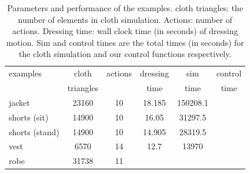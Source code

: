 \begin{table}
  \centering
  \begin{tabular}{|l|c|c|c|c|c|}
    \hline
    examples 		& cloth 	& actions 	& dressing 	& sim 		& control \\
    				& triangles & 			& time 		& time 		& time \\
    \hline
    jacket 			& 23160  	& 10		& 18.185 	& 150208.1	&     \\
    shorts (sit) 	& 14900 	& 10		& 16.05 	& 31297.5 	&  \\
    shorts (stand)	& 14900 	& 10		& 14.905	& 28319.5	&  \\
    vest 			& 6570 		& 14		& 12.7		& 13970		&    \\
    robe 			& 31738 	& 11		& 			& 			&    \\
    \hline
  \end{tabular}
  \caption{Parameters and performance of the examples. cloth triangles: the number of elements in cloth simulation. Actions: number of actions. Dressing time: wall clock time (in seconds) of dressing motion. Sim and control times are the total times (in seconds) for the cloth simulation and our control functions respectively.}
  \label{table:data}
\end{table}

